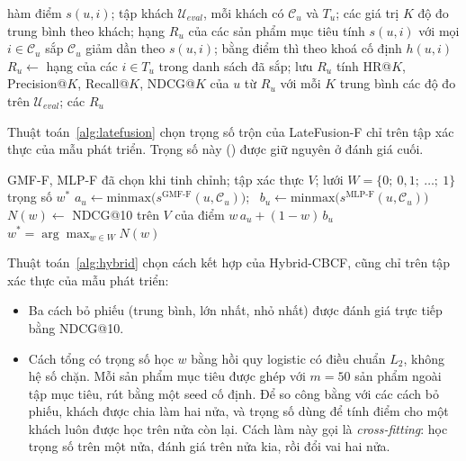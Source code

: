 \begin{algorithm}[H]
\caption{Đánh giá bằng xếp hạng toàn bộ tập ứng viên}
\label{alg:fullranking}
\begin{algorithmic}[1]
\Require hàm điểm $s(u, i)$; tập khách $\mathcal{U}_{eval}$, mỗi khách có $\mathcal{C}_u$ và $T_u$; các giá trị $K$
\Ensure độ đo trung bình theo khách; hạng $R_u$ của các sản phẩm mục tiêu
    \State tính $s(u, i)$ với mọi $i \in \mathcal{C}_u$ 
    \State sắp $\mathcal{C}_u$ giảm dần theo $s(u, i)$; bằng điểm thì theo khoá cố định $h(u, i)$
    \State $R_u \gets$ hạng của các $i \in T_u$ trong danh sách đã sắp; lưu $R_u$
    \State tính HR@$K$, Precision@$K$, Recall@$K$, NDCG@$K$ của $u$ từ $R_u$ với mỗi $K$
\EndFor
\State \Return trung bình các độ đo trên $\mathcal{U}_{eval}$; các $R_u$
\end{algorithmic}
\end{algorithm}

Thuật toán~\ref{alg:latefusion} chọn trọng số trộn của LateFusion-F chỉ trên tập xác thực của mẫu phát triển. Trọng số này () được giữ nguyên ở đánh giá cuối.

\begin{algorithm}[H]
\caption{Chọn trọng số của LateFusion-F}
\label{alg:latefusion}
\begin{algorithmic}[1]
\Require GMF-F, MLP-F đã chọn khi tinh chỉnh; tập xác thực $V$; lưới $W = \{0;\ 0{,}1;\ \dots;\ 1\}$
\Ensure trọng số $w^*$
    \State $a_u \gets \mathrm{minmax}\big(s^{\text{GMF-F}}(u, \mathcal{C}_u)\big)$; \ $b_u \gets \mathrm{minmax}\big(s^{\text{MLP-F}}(u, \mathcal{C}_u)\big)$
\EndFor
{}
    \State $N(w) \gets$ NDCG@10 trên $V$ của điểm $w\,a_u + (1 - w)\,b_u$ 
\EndFor
\State \Return $w^* = \arg\max_{w \in W} N(w)$
\end{algorithmic}
\end{algorithm}

Thuật toán~\ref{alg:hybrid} chọn cách kết hợp của Hybrid-CBCF, cũng chỉ trên tập xác thực của mẫu phát triển:
\begin{itemize}
    \item Ba cách bỏ phiếu (trung bình, lớn nhất, nhỏ nhất) được đánh giá trực tiếp bằng NDCG@10.
    \item Cách tổng có trọng số học $w$ bằng hồi quy logistic có điều chuẩn $L_2$, không hệ số chặn. Mỗi sản phẩm mục tiêu được ghép với $m = 50$ sản phẩm ngoài tập mục tiêu, rút bằng một seed cố định. Để so công bằng với các cách bỏ phiếu, khách được chia làm hai nửa, và trọng số dùng để tính điểm cho một khách luôn được học trên nửa còn lại. Cách làm này gọi là \textit{cross-fitting}: học trọng số trên một nửa, đánh giá trên nửa kia, rồi đổi vai hai nửa.
\end{itemize}

